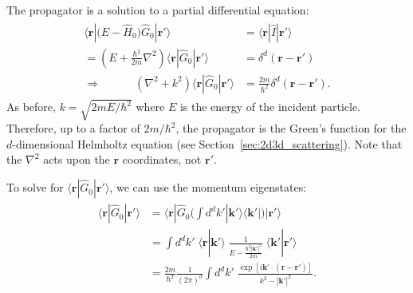 \documentclass[pra,12pt]{revtex4}
\begin{document}
The propagator is a solution to a partial differential equation:
\begin{align}
  \begin{aligned}\langle\mathbf{r} |\big(E-\hat{H}_0\big) \hat{G}_0 |\mathbf{r}'\rangle &= \langle\mathbf{r}|\hat{I}|\mathbf{r}'\rangle \\ = \left(E + \frac{\hbar^2}{2m}\nabla^2 \right) \langle\mathbf{r} |\hat{G}_0 |\mathbf{r}'\rangle &= \delta^d(\mathbf{r}-\mathbf{r}') \\ \Rightarrow \qquad\quad \left(\nabla^2 + k^2\right) \langle\mathbf{r} |\hat{G}_0 |\mathbf{r}'\rangle &= \frac{2m}{\hbar^2} \delta^d(\mathbf{r}-\mathbf{r}').\end{aligned}
\end{align}
As before, $k = \sqrt{2mE/\hbar^2}$ where $E$ is the energy of the
incident particle.  Therefore, up to a factor of $2m/\hbar^2$, the
propagator is the Green's function for the $d$-dimensional Helmholtz
equation (see Section~\ref{sec:2d3d_scattering}).  Note that the
$\nabla^2$ acts upon the $\mathbf{r}$ coordinates, not $\mathbf{r}'$.

To solve for $\langle\mathbf{r}|\hat{G}_0|\mathbf{r}'\rangle$, we can
use the momentum eigenstates:
\begin{align}
  \begin{aligned}\langle\mathbf{r}|\hat{G}_0|\mathbf{r}'\rangle &=
    \langle\mathbf{r}|\hat{G}_0 \Big(\int d^dk' |\mathbf{k}'\rangle\langle\mathbf{k}'| \Big) |\mathbf{r}'\rangle \\ &= \int d^dk' \; \langle\mathbf{r}|\mathbf{k}'\rangle \; \frac{1}{E-\frac{\hbar^2|\mathbf{k}'|^2}{2m}} \; \langle\mathbf{k}'|\mathbf{r}'\rangle \\ &= \frac{2m}{\hbar^2} \frac{1}{(2\pi)^d} \int d^dk' \; \frac{\exp\left[i\mathbf{k}' \cdot (\mathbf{r}-\mathbf{r}')\right]}{k^2-|\mathbf{k}'|^2}.\end{aligned}
\end{align}
\end{document}
